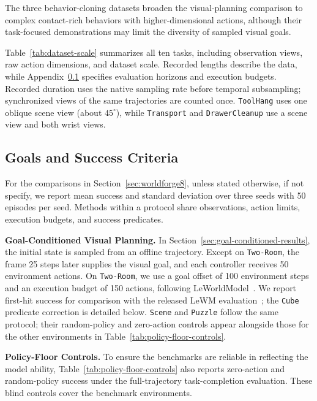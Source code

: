 \documentclass{article} %
\newcommand{\methodname}[1]{\textup{#1}}
\newcommand{\dataset}[1]{\texttt{#1}}
\newcommand{\lead}[1]{\textbf{#1}}
\begin{document}
The three behavior-cloning datasets broaden the visual-planning comparison to
complex contact-rich behaviors with higher-dimensional actions, although their
task-focused demonstrations may limit the diversity of sampled visual goals.

Table~\ref{tab:dataset-scale} summarizes all ten tasks, including observation
views, raw action dimensions, and dataset scale.
Recorded lengths describe the data, while Appendix~\ref{app:splits} specifies
evaluation horizons and execution budgets. Recorded duration uses the native
sampling rate before temporal subsampling; synchronized views of the same
trajectories are counted once. \dataset{ToolHang} uses one oblique scene view
(about $45^\circ$), while \dataset{Transport} and \dataset{DrawerCleanup} use a
scene view and both wrist views.




\subsection{Goals and Success Criteria}
\label{app:splits}

For the comparisons in Section~\ref{sec:worldforge8}, unless stated otherwise, if not specify, 
we report mean success and standard deviation over three seeds with 50 episodes per seed.
Methods within a protocol share observations, action limits, execution budgets, and
success predicates.

\lead{Goal-Conditioned Visual Planning.} In Section~\ref{sec:goal-conditioned-results},
the initial state is sampled from an offline trajectory. Except on \dataset{Two-Room}, the frame 25 steps later
supplies the visual goal, and each controller receives 50 environment actions. On \dataset{Two-Room}, we use a goal offset of 100 environment steps and an execution budget of 150 actions, following \methodname{LeWorldModel}~\citep{maes2026lewm}.
We report first-hit success for comparison with the released
\methodname{LeWM} evaluation~\citep{maes2026lewm}; the \dataset{Cube} predicate correction
is detailed below. \dataset{Scene} and \dataset{Puzzle} follow the same protocol;
their random-policy and zero-action controls appear alongside those for the other
environments in Table~\ref{tab:policy-floor-controls}.

\lead{Policy-Floor Controls.} To ensure the benchmarks are reliable in reflecting the model ability, Table~\ref{tab:policy-floor-controls} also reports
zero-action and random-policy success under the full-trajectory task-completion
evaluation. These blind controls cover the benchmark environments.
\end{document}
